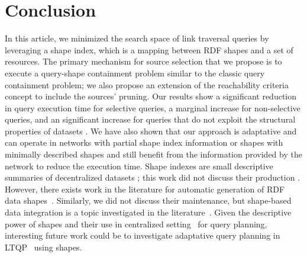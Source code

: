 \section{Conclusion}

In this article, we minimized the search space of link traversal queries by leveraging a shape index, which is a mapping between RDF shapes and a set of resources.
The primary mechanism for source selection that we propose is to execute a query-shape containment problem similar to the classic query containment problem; we also 
propose an extension of the reachability criteria concept to include the sources' pruning.
Our results show a significant  reduction in query execution time for selective queries,
a marginal increase for non-selective queries,
and an significant increase for queries that do not exploit the structural properties of datasets .
We have also shown that our approach is adaptative and can operate in networks with partial shape index information or shapes with minimally described shapes and still benefit
from the information provided by the network to reduce the execution time.
Shape indexes are small descriptive summaries of decentralized datasets ; this work did not discuss their production .
However, there exists work in the literature for automatic generation of RDF data shapes~\cite{fernandez2023extracting}.
Similarly, we did not discuss their maintenance, but shape-based data integration is a topic investigated in the literature~\cite {LabraGayo2023}. 
Given the descriptive power of shapes and their use in centralized setting~\cite{kashif2021} for query planning, interesting future work could be to investigate adaptative
query planning in LTQP~\cite{taelman2024towards} using shapes.   

